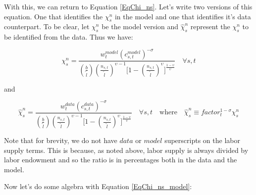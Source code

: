 \documentclass[letterpaper,12pt]{article}
\theoremstyle{definition}
\begin{document}
  With this, we can return to Equation \ref{EqChi_ns}.  Let's write two versions of this equation.  One that identifies the $\chi^{n}_{s}$ in the model and one that identifies it's data counterpart.  To be clear, let $\chi^{n}_{s}$ be the model version and $\hat{\chi}^{n}_{s}$ represent the $\chi^{n}_{s}$ to be identified from the data.  Thus we have:

  \begin{equation}\label{EqChi_ns_model}
    \chi^n_s = \frac{w^{model}_t\left(c^{model}_{s,t}\right)^{-\sigma}}{\left(\frac{b}{\tilde{l}}\right)\left(\frac{n_{s,t}}{\tilde{l}}\right)^{\upsilon-1}\Biggl[1 - \left(\frac{n_{s,t}}{\tilde{l}}\right)^\upsilon\Biggr]^{\frac{1-\upsilon}{\upsilon}}} \quad\forall s, t
  \end{equation}

  and

  \begin{equation}\label{EqChi_ns_data}
    \hat{\chi}^n_s = \frac{w^{data}_t\left(c^{data}_{s,t}\right)^{-\sigma}}{\left(\frac{b}{\tilde{l}}\right)\left(\frac{n_{s,t}}{\tilde{l}}\right)^{\upsilon-1}\Biggl[1 - \left(\frac{n_{s,t}}{\tilde{l}}\right)^\upsilon\Biggr]^{\frac{1-\upsilon}{\upsilon}}} \quad\forall s, t \quad\text{where}\quad \hat{\chi}^n_s\equiv factor_t^{1-\sigma}\chi^n_s
  \end{equation}

  Note that for brevity, we do not have $data$ or $model$ superscripts on the labor supply terms.  This is because, as noted above, labor supply is always divided by labor endowment and so the ratio is in percentages both in the data and the model.

  Now let's do some algebra with Equation \ref{EqChi_ns_model}:
\end{document}
